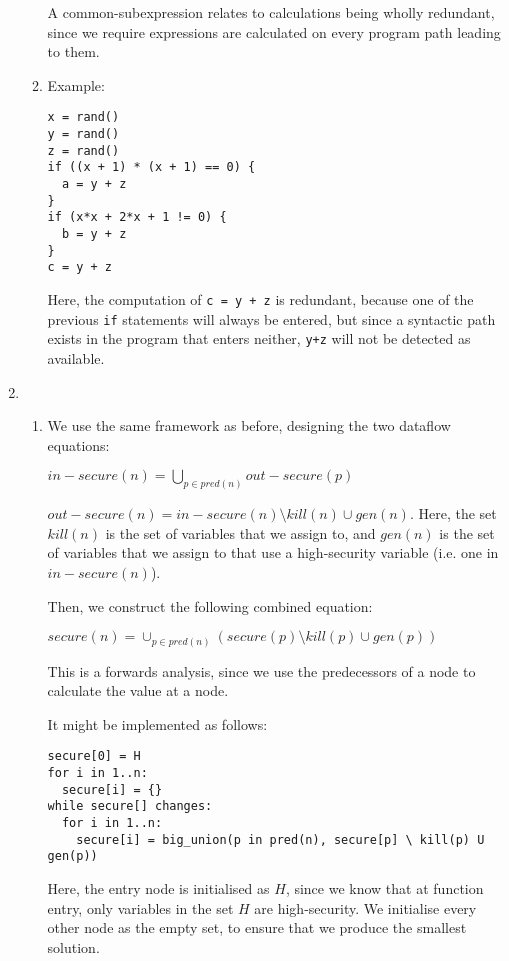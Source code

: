 \begin{enumerate}[label=(\alph*)]
\begin{enumerate}[label=(\roman*)]
A common-subexpression relates to calculations being wholly redundant, since we require expressions are calculated on every program path leading to them.

\item
  Example:

\begin{verbatim}
x = rand()
y = rand()
z = rand()
if ((x + 1) * (x + 1) == 0) {
  a = y + z
}
if (x*x + 2*x + 1 != 0) {
  b = y + z
}
c = y + z
\end{verbatim}

Here, the computation of \texttt{c = y + z} is redundant, because one of the previous \texttt{if} statements will always be entered, but since a syntactic path exists in the program that enters neither, \texttt{y+z} will not be detected as available.
    \end{enumerate}

  \item
    \begin{enumerate}[label=(\roman*)]

      \item

        We use the same framework as before, designing the two dataflow equations:

        $in-secure(n) = \bigcup_{p \in pred(n)} out-secure(p)$

        $out-secure(n) = in-secure(n) \setminus kill(n) \cup gen(n)$. Here, the set $kill(n)$ is the set of variables that we assign to, and $gen(n)$ is the set of variables that we assign to that use a high-security variable (i.e. one in $in-secure(n)$).

        Then, we construct the following combined equation:

        $secure(n) = \cup_{p \in pred(n)} (secure(p) \setminus kill(p) \cup gen(p))$

        This is a forwards analysis, since we use the predecessors of a node to calculate the value at a node.

        It might be implemented as follows:

\begin{verbatim}
secure[0] = H
for i in 1..n:
  secure[i] = {}
while secure[] changes:
  for i in 1..n:
    secure[i] = big_union(p in pred(n), secure[p] \ kill(p) U gen(p))
\end{verbatim}

Here, the entry node is initialised as $H$, since we know that at function entry, only variables in the set $H$ are high-security. We initialise every other node as the empty set, to ensure that we produce the smallest solution.


\end{enumerate}
\end{enumerate}
